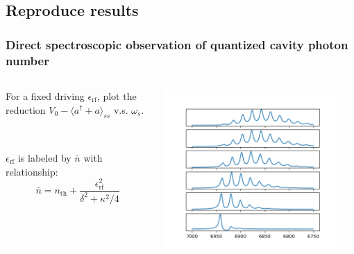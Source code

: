 \documentclass[xcolor=dvipsnames,hyperref={CJKbookmarks=true},aspectratio=169]{beamer}
\newcommand{\rf}{\text{rf}}
\newcommand{\thm}{\text{th}}
\begin{document}
\subsection{Reproduce results}
\begin{frame}[t]\frametitle{Direct spectroscopic observation of quantized cavity photon number}
\begin{columns}
\begin{column}{0.4\linewidth}
	For a fixed driving $\epsilon_{\rf}$, plot the reduction
	$V_0 - \langle a^\dag + a\rangle_{ss}$ v.s. $\omega_{s}$. 

~

	$\epsilon_{\rf}$ is labeled by $\bar n$ with relationship:
	\begin{equation*}
		\bar n = n_{\thm} + \frac{\epsilon_{\rf}^2}{\delta^2 + \kappa^2/4}
	\end{equation*}
\end{column}%
\begin{column}{0.6\linewidth}
	\centering
    \includegraphics[width=0.9\textwidth]{sweaping.png}
\end{column}
\end{columns}
\end{frame}
\end{document}
